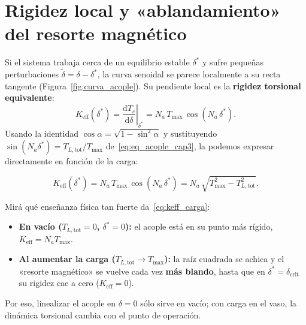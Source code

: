 \documentclass[11pt,a4paper,oneside]{book}
\newcommand{\dd}{\mathrm{d}}
\begin{document}
\section{Rigidez local y «ablandamiento» del resorte magnético}

Si el sistema trabaja cerca de un equilibrio estable $\delta^\ast$ y sufre
pequeñas perturbaciones $\tilde\delta = \delta - \delta^\ast$, la curva
senoidal se parece localmente a su recta tangente (Figura~\ref{fig:curva_acople}).
Su pendiente local es la \textbf{rigidez torsional equivalente}:
\begin{equation}
  K_{\text{eff}}(\delta^\ast)
  = \left.\frac{\dd T_c}{\dd\delta}\right|_{\delta^\ast}
  = N_a\,T_{\max}\,\cos(N_a\,\delta^\ast).
  \label{eq:keff_cos}
\end{equation}
Usando la identidad $\cos\alpha = \sqrt{1 - \sin^2\alpha}$ y sustituyendo
$\sin(N_a\delta^\ast) = T_{L,\text{tot}}/T_{\max}$ de~\eqref{eq:eq_acople_cap3},
la podemos expresar directamente en función de la carga:
\begin{ecuacionclave}
\begin{equation}
  K_{\text{eff}}(\delta^\ast)
  = N_a\,T_{\max}\,\cos(N_a\,\delta^\ast)
  = N_a\,\sqrt{T_{\max}^2 - T_{L,\text{tot}}^2}.
  \label{eq:keff_carga}
\end{equation}
\end{ecuacionclave}

\begin{lectura}
Mirá qué enseñanza física tan fuerte da~\eqref{eq:keff_carga}:
\begin{itemize}
  \item \textbf{En vacío ($T_{L,\text{tot}} = 0$, $\delta^\ast = 0$):} el acople
        está en su punto más rígido, $K_{\text{eff}} = N_a T_{\max}$.
  \item \textbf{Al aumentar la carga ($T_{L,\text{tot}} \to T_{\max}$):} la
        raíz cuadrada se achica y el «resorte magnético» se vuelve cada vez
        \textbf{más blando}, hasta que en $\delta^\ast = \delta_{\text{crit}}$
        su rigidez cae a cero ($K_{\text{eff}} = 0$).
\end{itemize}
Por eso, linealizar el acople en $\delta = 0$ sólo sirve en vacío; con carga en
el vaso, la dinámica torsional cambia con el punto de operación.
\end{lectura}
\end{document}
